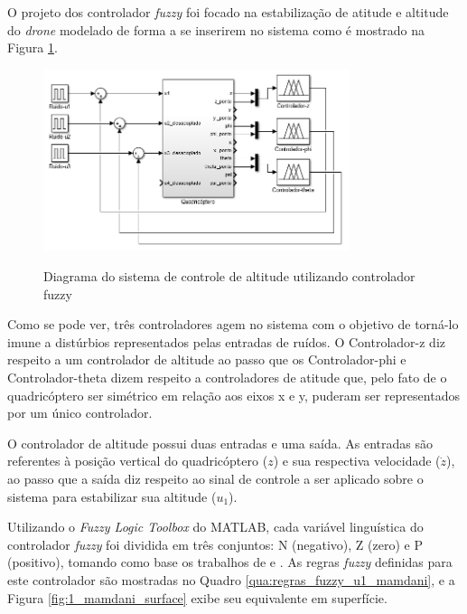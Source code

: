 O projeto dos controlador \textit{fuzzy} foi focado na estabilização de atitude e altitude do \textit{drone} modelado de forma a se inserirem no sistema como é mostrado na Figura \ref{fig:diagrama_sistema_controlado}.

\begin{figure}[!htb]
    \centering
    \caption{Diagrama do sistema de controle de altitude utilizando controlador fuzzy}
    \includegraphics[width=0.8\textwidth]{./04-figuras/figuras_pos_banca/2-sistema_completo_controlado/diagrama_sistema_controlado}
    \label{fig:diagrama_sistema_controlado}
\end{figure}

Como se pode ver, três controladores agem no sistema com o objetivo de torná-lo imune a distúrbios representados pelas entradas de ruídos. O {\ttfamily Controlador-z} diz respeito a um controlador de altitude ao passo que os {\ttfamily Controlador-phi} e {\ttfamily Controlador-theta} dizem respeito a controladores de atitude que, pelo fato de o quadricóptero ser simétrico em relação aos eixos x e y, puderam ser representados por um único controlador.

O controlador de altitude possui duas entradas e uma saída. As entradas são referentes à posição vertical do quadricóptero ($z$) e sua respectiva velocidade ($\dot{z}$), ao passo que a saída diz respeito ao sinal de controle a ser aplicado sobre o sistema para estabilizar sua altitude ($u_1$).

Utilizando o \textit{Fuzzy Logic Toolbox} do MATLAB, cada variável linguística do controlador \textit{fuzzy} foi dividida em três conjuntos: N (negativo), Z (zero) e P (positivo), tomando como base os trabalhos de  e . As regras \textit{fuzzy} definidas para este controlador são mostradas no Quadro \ref{qua:regras_fuzzy_u1_mamdani}, e a Figura \ref{fig:1_mamdani_surface} exibe seu equivalente em superfície.

